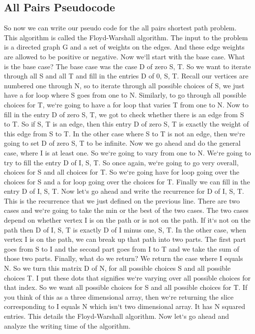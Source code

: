 \subsection{All Pairs  Pseudocode}
So now we can write our pseudo code for the all pairs shortest path problem.
This algorithm is called the Floyd-Warshall algorithm.
The input to the problem is a directed graph G and a set of weights on the edges.
And these edge weights are allowed to be positive or negative.
Now we`ll start with the base case.
What is the base case? The base case was the case D of zero S, T\@.
So we want to iterate through all S and all T and fill in the entries D of 0, S, T\@.
Recall our vertices are numbered one through N, so to iterate through all possible choices of S, we just have a for loop where S goes from one to N\@.
Similarly, to go through all possible choices for T, we`re going to have a for loop that varies T from one to N\@.
Now to fill in the entry D of zero S, T, we got to check whether there is an edge from S to T\@.
So if S, T is an edge, then this entry D of zero S, T is exactly the weight of this edge from S to T\@.
In the other case where S to T is not an edge, then we`re going to set D of zero S, T to be infinite.
Now we go ahead and do the general case, where I is at least one.
So we`re going to vary from one to N\@.
We`re going to try to fill the entry D of I, S, T\@.
So once again, we`re going to go very overall, choices for S and all choices for T\@.
So we`re going have for loop going over the choices for S and a for loop going over the choices for T\@.
Finally we can fill in the entry D of I, S, T\@.
Now let`s go ahead and write the recurrence for D of I, S, T\@.
This is the recurrence that we just defined on the previous line.
There are two cases and we`re going to take the min or the best of the two cases.
The two cases depend on whether vertex I is on the path or is not on the path.
If it`s not on the path then D of I, S, T is exactly D of I minus one, S, T\@.
In the other case, when vertex I is on the path, we can break up that path into two parts.
The first part goes from S to I and the second part goes from I to T and we take the sum of those two parts.
Finally, what do we return? We return the case where I equals N\@.
So we turn this matrix D of N, for all possible choices S and all possible choices T\@.
I put these dots that signifies we`re varying over all possible choices for that index.
So we want all possible choices for S and all possible choices for T\@.
If you think of this as a three dimensional array, then we`re returning the slice corresponding to I equals N which isn`t two dimensional array.
It has N squared entries.
This details the Floyd-Warshall algorithm.
Now let`s go ahead and analyze the writing time of the algorithm.

